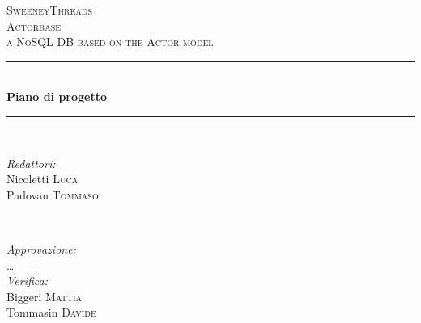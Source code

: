 \documentclass[a4paper]{report}
\begin{document}
	\begin{titlepage}
		\newcommand{\HRule}{\rule{\linewidth}{0.5mm}} 
		\center  
		
		\textsc{\LARGE SweeneyThreads}\\[1.5cm] 
		\textsc{\Large Actorbase}\\[0.5cm] 
		\textsc{\large a NoSQL DB based on the Actor model}\\[0.5cm]
		
		
		\HRule \\[0.4cm]
		{ \huge \bfseries Piano di progetto}\\[0.4cm] 
		\HRule \\[1.5cm]
		
		\begin{minipage}{0.4\textwidth}
			\begin{flushleft} \large
				\emph{Redattori:}\\
				Nicoletti \textsc{Luca} \\
				Padovan \textsc{Tommaso} \\
			\end{flushleft}
		\end{minipage}
		~
		\begin{minipage}{0.4\textwidth}
			\begin{flushright} \large
				\emph{Approvazione:} \\
				\dots \\
				\emph{Verifica:} \\
				Biggeri \textsc{Mattia} \\
				Tommasin \textsc{Davide} \\
			\end{flushright}
		\end{minipage}
		

\end{titlepage}
\end{document}
